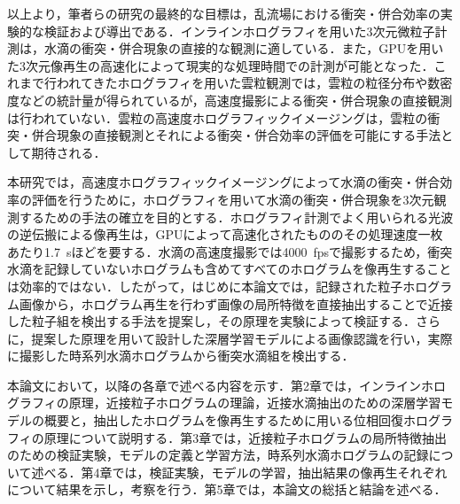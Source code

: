 以上より，筆者らの研究の最終的な目標は，乱流場における衝突・併合効率の実験的な検証および導出である．インラインホログラフィ\cite{gabor}を用いた3次元微粒子計測\cite{tanaka2016,kubonishi2018,nakatani2019}は，水滴の衝突・併合現象の直接的な観測に適している．また，GPUを用いた3次元像再生の高速化\cite{shimobaba2008, tanaka2019, nakai2022, tanaka2024}によって現実的な処理時間での計測が可能となった．これまで行われてきたホログラフィを用いた雲粒観測\cite{thompson1974,brown1989,fugal2009}では，雲粒の粒径分布や数密度などの統計量が得られているが，高速度撮影による衝突・併合現象の直接観測は行われていない．雲粒の高速度ホログラフィックイメージングは，雲粒の衝突・併合現象の直接観測とそれによる衝突・併合効率の評価を可能にする手法として期待される．

本研究では，高速度ホログラフィックイメージングによって水滴の衝突・併合効率の評価を行うために，ホログラフィを用いて水滴の衝突・併合現象を3次元観測するための手法の確立を目的とする．ホログラフィ計測でよく用いられる光波の逆伝搬による像再生は，GPUによって高速化されたもののその処理速度一枚あたり\SI{1.7}{s}ほどを要する\cite{nakai2022}．水滴の高速度撮影では\SI{4000}{fps}で撮影するため，衝突水滴を記録していないホログラムも含めてすべてのホログラムを像再生することは効率的ではない．したがって，はじめに本論文では，記録された粒子ホログラム画像から，ホログラム再生を行わず画像の局所特徴を直接抽出することで近接した粒子組を検出する手法を提案し，その原理を実験によって検証する\cite{nakai2023}．さらに，提案した原理を用いて設計した深層学習モデルによる画像認識を行い，実際に撮影した時系列水滴ホログラムから衝突水滴組を検出する．


本論文において，以降の各章で述べる内容を示す．第2章では，インラインホログラフィの原理，近接粒子ホログラムの理論，近接水滴抽出のための深層学習モデルの概要と，抽出したホログラムを像再生するために用いる位相回復ホログラフィの原理について説明する．第3章では，近接粒子ホログラムの局所特徴抽出のための検証実験，モデルの定義と学習方法，時系列水滴ホログラムの記録について述べる．第4章では，検証実験，モデルの学習，抽出結果の像再生それぞれについて結果を示し，考察を行う．第5章では，本論文の総括と結論を述べる．